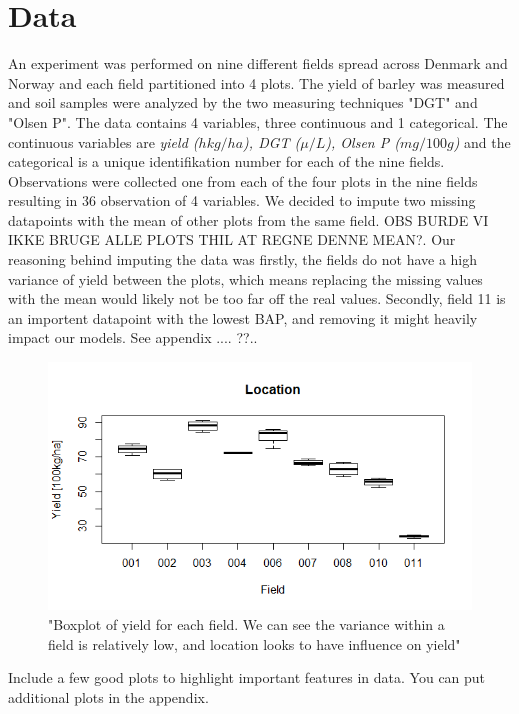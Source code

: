 \documentclass{article}
\begin{document}
\section{Data}
An experiment was performed on nine different fields spread across Denmark and Norway and each field partitioned into 4 plots. The yield of barley was measured and soil samples were analyzed by the two measuring techniques "DGT" and "Olsen P".
The data contains 4 variables, three continuous and 1 categorical. The continuous variables are \textit{yield ($hkg/ha$), DGT ($\mu/L$), Olsen P ($mg/100g$)} and the categorical is a unique identifikation number for each of the nine fields.
Observations were collected one from each of the four plots in the nine fields resulting in 36 observation of 4 variables.
We decided to impute two missing datapoints with the mean of other plots from the same field. OBS BURDE VI IKKE BRUGE ALLE PLOTS THIL AT REGNE DENNE MEAN?.
Our reasoning behind imputing the data was firstly, the fields do not have a high variance of yield between the plots, which means replacing the missing values with the mean would likely not be too far off the real values.
Secondly, field 11 is an importent datapoint with the lowest BAP, and removing it might heavily impact our models. See appendix .... ??..
 
\begin{figure}[H]
\includegraphics[width=\linewidth]{locationYield.png}
\caption{"Boxplot of yield for each field. We can see the variance within a field is relatively low, and location looks to have influence on yield"}
\label{fig:loc}
\end{figure}


Include a few good plots to highlight important features in data. You can put additional plots in the appendix.
\end{document}
